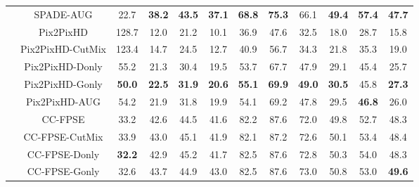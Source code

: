 \documentclass[final]{cvpr}
\newcommand\+{\mkern4mu}
\begin{document}
\begin{table*}[h]
{\begin{tabular}{@{}lc@{\hspace{0.3cm}}c@{\hspace{0.7cm}}ccc@{\hspace{0.7cm}}ccc@{\hspace{0.7cm}}ccc@{}}
			& \small \small SPADE-AUG & \small 22.7 & \small \textbf{38.2} & \small \textbf{43.5} & \small \textbf{37.1} & \small \textbf{68.8} & \small \textbf{75.3} & \small 66.1 & \small \textbf{49.4} & \small \textbf{57.4} & \small \textbf{47.7} \tabularnewline[0.2cm] 
			


			& \small Pix2PixHD & \small 128.7 & \small 12.0 & \small 21.2 & \small 10.1 & \small 36.9 & \small 47.6 & \small 32.5 & \small 18.0 & \small 28.7 & \small 15.8 \tabularnewline
			
			& \small Pix2PixHD-CutMix & \small 123.4 & \small	14.7 & \small	24.5 & \small	12.7 & \small	40.9 & \small	56.7 & \small	34.3 & \small	21.8 & \small	35.3 & \small	19.0 \tabularnewline
			
			& \small Pix2PixHD-Donly & \small 55.2 & \small	21.3 & \small	30.4 & \small	19.5 & \small	53.7 & \small	67.7 & \small	47.9 & \small 29.1 & \small 45.4 & \small 25.7 \tabularnewline
			& \small Pix2PixHD-Gonly & \small \textbf{50.0} & \small \textbf{22.5} & \small \textbf{31.9} & \small \textbf{20.6} & \small \textbf{55.1} & \small \textbf{69.9} & \small \textbf{49.0} & \small \textbf{30.5} & \small 45.8 & \small \textbf{27.3} \tabularnewline
						
			& \small Pix2PixHD-AUG & \small 54.2 & \small 21.9 & \small 31.8 & \small 19.9 & \small 54.1 & \small 69.2 & \small 47.8 & \small 29.5 & \small \textbf{46.8} & \small 26.0 \tabularnewline
			


\cmidrule(lr){2-12}	
			


			\multirow{15}{*}{  \rotatebox{90}{ADE20K }} & \small \small	CC-FPSE   & \small 33.2 & \small 42.6 & \small 44.5 & \small 41.6 & \small 82.2 & \small 87.6 & \small 72.0 & \small 49.8 & \small 52.7 & \small 48.3 \tabularnewline
			
			& \small CC-FPSE-CutMix & \small 33.9 & \small	43.0 & \small	45.1 & \small	41.9 & \small	82.1 & \small	87.2 & \small	72.6 & \small	50.1 & \small	53.4 & \small	48.4 \tabularnewline	
			
			& \small CC-FPSE-Donly & \small \textbf{32.2} & \small	42.9 & \small	45.2 & \small	41.7 & \small	82.5 & \small	87.6 & \small	72.8 & \small	50.3 & \small	54.0 & \small	48.3 \tabularnewline	
			& \small CC-FPSE-Gonly & \small 32.6 & \small	43.7 & \small	44.9 & \small	43.0 & \small	82.5 & \small	87.6 & \small	73.0 & \small	50.8 & \small	53.0 & \small \textbf{49.6} \tabularnewline	
			

\end{tabular}}
\end{table*}
\end{document}
